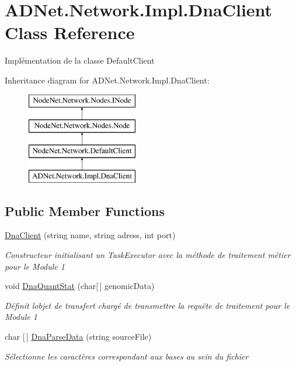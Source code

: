 \hypertarget{class_a_d_net_1_1_network_1_1_impl_1_1_dna_client}{}\section{A\+D\+Net.\+Network.\+Impl.\+Dna\+Client Class Reference}
\label{class_a_d_net_1_1_network_1_1_impl_1_1_dna_client}


Implémentation de la classe Default\+Client  


Inheritance diagram for A\+D\+Net.\+Network.\+Impl.\+Dna\+Client\+:\begin{figure}[H]
\begin{center}
\leavevmode
\includegraphics[height=4.000000cm]{class_a_d_net_1_1_network_1_1_impl_1_1_dna_client}
\end{center}
\end{figure}
\subsection*{Public Member Functions}
\begin{DoxyCompactItemize}
\item 
\hyperlink{class_a_d_net_1_1_network_1_1_impl_1_1_dna_client_a2b39d681bb82f1335aaecc3ecbbf5ef7}{Dna\+Client} (string name, string adress, int port)
\begin{DoxyCompactList}\small\item\em Constructeur initialisant un Task\+Executor avec la méthode de traitement métier pour le Module 1 \end{DoxyCompactList}\item 
void \hyperlink{class_a_d_net_1_1_network_1_1_impl_1_1_dna_client_af490dfa3abbce0400e5541e0a44f4b27}{Dna\+Quant\+Stat} (char\mbox{[}$\,$\mbox{]} genomic\+Data)
\begin{DoxyCompactList}\small\item\em Définit l\textquotesingle{}objet de transfert chargé de transmettre la requête de traitement pour le Module 1 \end{DoxyCompactList}\item 
char \mbox{[}$\,$\mbox{]} \hyperlink{class_a_d_net_1_1_network_1_1_impl_1_1_dna_client_a01469d76896a25450e36ad1cef4f3048}{Dna\+Parse\+Data} (string source\+File)
\begin{DoxyCompactList}\small\item\em Sélectionne les caractères correspondant aux bases au sein du fichier \end{DoxyCompactList}\end{DoxyCompactItemize}
